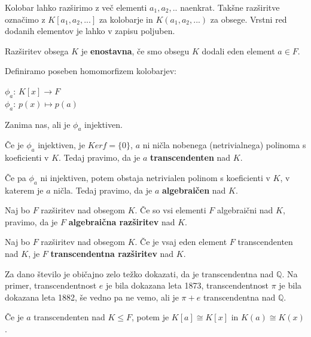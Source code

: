 \documentclass[11pt, a4paper]{article}
\begin{document}
    Kolobar lahko razširimo z več elementi \(a_1,a_2,..\) naenkrat. Takšne razširitve označimo z \(K[a_1,a_2,...]\) za kolobarje in \(K(a_1,a_2,...)\) za obsege. Vrstni red dodanih elementov je lahko v zapisu poljuben.

    \begin{definition}
        Razširitev obsega \(K\) je \textbf{enostavna}, če smo obsegu \(K\) dodali eden element \(a \in F\).
    \end{definition}

    Definiramo poseben homomorfizem kolobarjev:
    \begin{center}
        \(\phi_a\): \(K[x] \to F\) \\
        \(\phi_a\): \(p(x) \mapsto p(a)\)
    \end{center}

    Zanima nas, ali je \(\phi_a\) injektiven.
    \par
    Če je \(\phi_a\) injektiven, je \(Ker f = \{0\}\), \(a\) ni ničla nobenega (netrivialnega) polinoma s koeficienti v \(K\). Tedaj pravimo, da je \(a\) \textbf{transcendenten} nad \(K\).
    \par
    Če pa \(\phi_a\) ni injektiven, potem obstaja netrivialen polinom s koeficienti v \(K\), v katerem je \(a\) ničla. Tedaj pravimo, da je \(a\) \textbf{algebraičen} nad \(K\).
    
    \begin{definition}
        Naj bo \(F\) razširitev nad obsegom \(K\). Če so vsi elementi \(F\) algebraični nad \(K\), pravimo, da je \(F\) \textbf{algebraična razširitev} nad \(K\).
    \end{definition}

    \begin{definition}
        Naj bo \(F\) razširitev nad obsegom \(K\). Če je vsaj eden element \(F\) transcendenten nad \(K\), je \(F\) \textbf{transcendentna razširitev} nad \(K\). 
    \end{definition}

    \begin{remark}
        Za dano število je običajno zelo težko dokazati, da je transcendentna nad \(\mathbb{Q}\). Na primer, transcendentnost \(e\) je bila dokazana leta 1873, transcendentnost \(\pi\) je bila dokazana leta 1882, še vedno pa ne vemo, ali je \(\pi + e\) transcendentna nad \(\mathbb{Q}\).
    \end{remark}

    \begin{theorem}
        Če je \(a\) transcendenten nad \(K \le F\), potem je \(K[a] \cong K[x]\) in \(K(a) \cong K(x)\).
    \end{theorem}
\end{document}
